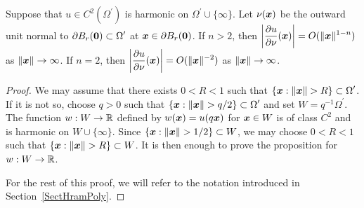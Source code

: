 \begin{prop} \label{pot_infty_ddu}
Suppose that $\displaystyle u\in C^2(\Omega^{\prime})$ is harmonic on
$\displaystyle \Omega^{\prime} \cup \{\infty\}$.  Let
$\nu({\bm{x}})$ be the outward
unit normal to $\displaystyle \partial B_r({\bm{0}}) \subset \Omega^{\prime}$ at
${\bm{x}} \in \partial B_r({\bm{0}})$.
If $n>2$, then
$\displaystyle \left| \frac{\partial{u}}{\partial \nu}({\bm{x}})\right| =
O(\|{\bm{x}}\|^{1-n})$ as $\|{\bm{x}}\|\rightarrow \infty$.  If $n=2$, then
$\displaystyle \left| \frac{\partial{u}}{\partial \nu}({\bm{x}})\right| =
O(\|{\bm{x}}\|^{-2})$ as $\|{\bm{x}}\|\rightarrow \infty$.
\end{prop}

\begin{proof}
We may assume that there exists $0<R<1$ such that
$\displaystyle \left\{ {\bm{x}} : \|{\bm{x}}\| > R \right\} \subset
\Omega^{\prime}$.
If it is not so, choose $q > 0$ such that 
$\displaystyle \left\{ {\bm{x}} : \|{\bm{x}}\| > q/2 \right\} \subset
\Omega^{\prime}$ and set $\displaystyle W = q^{-1} \Omega^{\prime}$.
The function $w: W \to \mathbb{R}$ defined by
$w({\bm{x}}) = u(q {\bm{x}})$ for ${\bm{x}} \in W$
is of class $\displaystyle C^2$ and is harmonic on $W \cup \{\infty\}$.
Since $\displaystyle \left\{ {\bm{x}} : \|{\bm{x}}\| > 1/2 \right\} \subset W$,
we may choose $0<R<1$ such that
$\displaystyle \left\{ {\bm{x}} : \|{\bm{x}}\| > R \right\} \subset W$.
It is then enough to prove the proposition for $w: W \to \mathbb{R}$.

For the rest of this proof, we will refer to the notation introduced
in Section~\ref{SectHramPoly}.


\end{proof}
